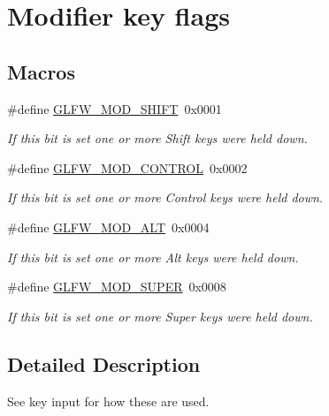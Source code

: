 \hypertarget{group__mods}{}\section{Modifier key flags}
\label{group__mods}
\subsection*{Macros}
\begin{DoxyCompactItemize}
\item 
\hypertarget{group__mods_ga14994d3196c290aaa347248e51740274}{}\#define \hyperlink{group__mods_ga14994d3196c290aaa347248e51740274}{G\+L\+F\+W\+\_\+\+M\+O\+D\+\_\+\+S\+H\+I\+F\+T}~0x0001\label{group__mods_ga14994d3196c290aaa347248e51740274}

\begin{DoxyCompactList}\small\item\em If this bit is set one or more Shift keys were held down. \end{DoxyCompactList}\item 
\hypertarget{group__mods_ga6ed94871c3208eefd85713fa929d45aa}{}\#define \hyperlink{group__mods_ga6ed94871c3208eefd85713fa929d45aa}{G\+L\+F\+W\+\_\+\+M\+O\+D\+\_\+\+C\+O\+N\+T\+R\+O\+L}~0x0002\label{group__mods_ga6ed94871c3208eefd85713fa929d45aa}

\begin{DoxyCompactList}\small\item\em If this bit is set one or more Control keys were held down. \end{DoxyCompactList}\item 
\hypertarget{group__mods_gad2acd5633463c29e07008687ea73c0f4}{}\#define \hyperlink{group__mods_gad2acd5633463c29e07008687ea73c0f4}{G\+L\+F\+W\+\_\+\+M\+O\+D\+\_\+\+A\+L\+T}~0x0004\label{group__mods_gad2acd5633463c29e07008687ea73c0f4}

\begin{DoxyCompactList}\small\item\em If this bit is set one or more Alt keys were held down. \end{DoxyCompactList}\item 
\hypertarget{group__mods_ga6b64ba10ea0227cf6f42efd0a220aba1}{}\#define \hyperlink{group__mods_ga6b64ba10ea0227cf6f42efd0a220aba1}{G\+L\+F\+W\+\_\+\+M\+O\+D\+\_\+\+S\+U\+P\+E\+R}~0x0008\label{group__mods_ga6b64ba10ea0227cf6f42efd0a220aba1}

\begin{DoxyCompactList}\small\item\em If this bit is set one or more Super keys were held down. \end{DoxyCompactList}\end{DoxyCompactItemize}


\subsection{Detailed Description}
See key input for how these are used. 